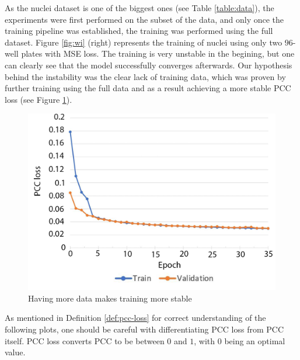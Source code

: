 

As the nuclei dataset is one of the biggest ones (see Table \ref{table:data}), the experiments were first performed on the subset of the data, and only once the training pipeline was established, the training was performed using the full dataset. Figure \ref{fig:wi} (right) represents the training of nuclei using only two $96$-well plates with MSE loss. The training is very unstable in the begining, but one can clearly see that the model successfully converges afterwards. Our hypothesis behind the instability was the clear lack of training data, which was proven by further training using the full data and as a result achieving a more stable PCC loss (see Figure \ref{fig:full-dataset-pcc}).

\begin{figure}[htb]
	\begin{center}
		\includegraphics[width=0.5\linewidth]{bilder/nuclei/full-dataset.png}
		\caption{Having more data makes training more stable}\label{fig:full-dataset-pcc}
	\end{center}
\end{figure}

As mentioned in Definition \ref{def:pcc-loss} for correct understanding of the following plots, one should be careful with differentiating PCC loss from PCC itself. PCC loss converts PCC to be between $0$ and $1$, with $0$ being an optimal value.

